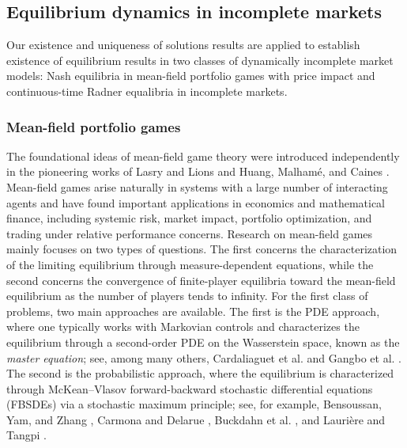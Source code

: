 \documentclass[10pt,a4paper]{article}
\theoremstyle{plain}
\theoremstyle{definition}
\numberwithin{equation}{section}
\begin{document}
\subsection{Equilibrium dynamics in incomplete markets}

Our existence and uniqueness of solutions results are applied to establish existence of equilibrium results in two classes of dynamically incomplete market models: Nash equilibria in mean-field portfolio games with price impact and continuous-time Radner equalibria in incomplete markets.  

\subsubsection{Mean-field portfolio games}

The foundational ideas of mean-field game theory were introduced independently in the pioneering works of Lasry and Lions \cite{LasryLions2007} and Huang, Malham\'e, and Caines \cite{HMC2006}. Mean-field games arise naturally in systems with a large number of interacting agents and have found important applications in economics and mathematical finance, including systemic risk, market impact, portfolio optimization, and trading under relative performance concerns.
Research on mean-field games mainly focuses on two types of questions. The first concerns the characterization of the limiting equilibrium through measure-dependent equations, while the second concerns the convergence of finite-player equilibria toward the mean-field equilibrium as the number of players tends to infinity.
For the first class of problems, two main approaches are available. The first is the PDE approach, where one typically works with Markovian controls and characterizes the equilibrium through a second-order PDE on the Wasserstein space, known as the {\it master equation}; see, among many others, Cardaliaguet et al. \cite{cardaliaguet2019master} and Gangbo et al. \cite{GangboMeszarosMouZhang2022}. The second is the probabilistic approach, where the equilibrium is characterized through McKean--Vlasov forward-backward stochastic differential equations (FBSDEs) via a stochastic maximum principle; see, for example, Bensoussan, Yam, and Zhang \cite{Ben-Yam-Zhang15}, Carmona and Delarue \cite{carmona-delarue13}, Buckdahn et al. \cite{Buck-Dje-Li-Peng09}, and Lauri\`ere and Tangpi \cite{lauriere-tanpi22}.
\end{document}
